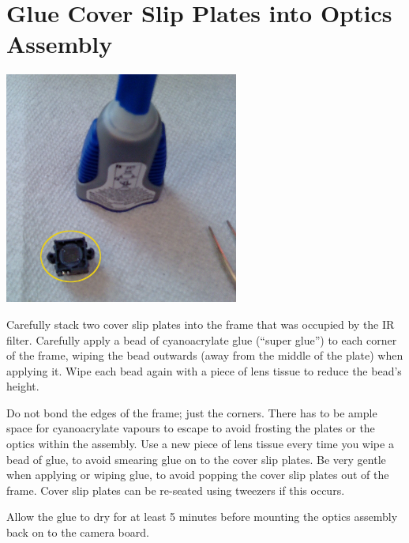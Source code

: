 \section{Glue Cover Slip Plates into Optics Assembly}

\includegraphics[height=3in]{pics-c920/15-superglue.jpg}

Carefully stack two cover slip plates into the frame that was occupied by
the IR filter. Carefully apply a bead of cyanoacrylate glue (``super glue'')
to each corner of the frame, wiping the bead outwards (away from the middle
of the plate) when applying it. Wipe each bead again with a piece of lens
tissue to reduce the bead's height.

Do not bond the edges of the frame; just the corners. There has to be ample
space for cyanoacrylate vapours to escape to avoid frosting the plates or
the optics within the assembly. Use a new piece of lens tissue every time
you wipe a bead of glue, to avoid smearing glue on to the cover slip plates.
Be very gentle when applying or wiping glue, to avoid popping the cover slip
plates out of the frame. Cover slip plates can be re-seated using tweezers
if this occurs.

Allow the glue to dry for at least 5 minutes before mounting the optics
assembly back on to the camera board.

%
